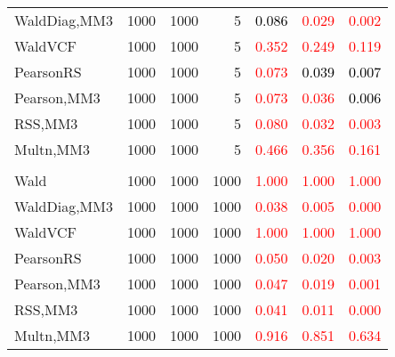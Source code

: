 \documentclass[
]{article}
\begin{document}
\begin{table}[H]
{\begin{tabular}[t]{lrrrrrr}
\hspace{1em}WaldDiag,MM3 & 1000 & 1000 & 5 & \textcolor{black}{0.086} & \textcolor{red}{0.029} & \textcolor{red}{0.002}\\
\hspace{1em}WaldVCF & 1000 & 1000 & 5 & \textcolor{red}{0.352} & \textcolor{red}{0.249} & \textcolor{red}{0.119}\\
\hspace{1em}PearsonRS & 1000 & 1000 & 5 & \textcolor{red}{0.073} & \textcolor{black}{0.039} & \textcolor{black}{0.007}\\
\hspace{1em}Pearson,MM3 & 1000 & 1000 & 5 & \textcolor{red}{0.073} & \textcolor{red}{0.036} & \textcolor{black}{0.006}\\
\hspace{1em}RSS,MM3 & 1000 & 1000 & 5 & \textcolor{red}{0.080} & \textcolor{red}{0.032} & \textcolor{red}{0.003}\\
\hspace{1em}Multn,MM3 & 1000 & 1000 & 5 & \textcolor{red}{0.466} & \textcolor{red}{0.356} & \textcolor{red}{0.161}\\
\addlinespace[0.3em]
\multicolumn{7}{l}{\textbf{1F 15V}}\\
\hspace{1em}Wald & 1000 & 1000 & 1000 & \textcolor{red}{1.000} & \textcolor{red}{1.000} & \vphantom{1} \textcolor{red}{1.000}\\
\hspace{1em}WaldDiag,MM3 & 1000 & 1000 & 1000 & \textcolor{red}{0.038} & \textcolor{red}{0.005} & \textcolor{red}{0.000}\\
\hspace{1em}WaldVCF & 1000 & 1000 & 1000 & \textcolor{red}{1.000} & \textcolor{red}{1.000} & \vphantom{1} \textcolor{red}{1.000}\\
\hspace{1em}PearsonRS & 1000 & 1000 & 1000 & \textcolor{red}{0.050} & \textcolor{red}{0.020} & \textcolor{red}{0.003}\\
\hspace{1em}Pearson,MM3 & 1000 & 1000 & 1000 & \textcolor{red}{0.047} & \textcolor{red}{0.019} & \textcolor{red}{0.001}\\
\hspace{1em}RSS,MM3 & 1000 & 1000 & 1000 & \textcolor{red}{0.041} & \textcolor{red}{0.011} & \textcolor{red}{0.000}\\
\hspace{1em}Multn,MM3 & 1000 & 1000 & 1000 & \textcolor{red}{0.916} & \textcolor{red}{0.851} & \textcolor{red}{0.634}\\

\end{tabular}}
\end{table}
\end{document}
